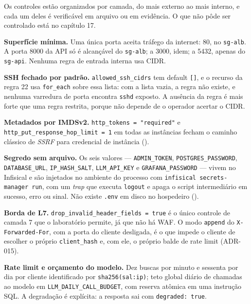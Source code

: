 \documentclass[11pt,a4paper]{article}
\begin{document}
Os controles estão organizados por camada, do mais externo ao mais interno, e cada um deles é
verificável em arquivo ou em evidência. O que não pôde ser controlado está no capítulo 17.

\textbf{Superfície mínima.} Uma única porta aceita tráfego da internet: 80, no \texttt{sg-alb}. A
porta 8000 da API só é alcançável do \texttt{sg-alb}; a 3000, idem; a 5432, apenas do
\texttt{sg-api}. Nenhuma regra de entrada interna usa CIDR.

\textbf{SSH fechado por padrão.} \texttt{allowed\_ssh\_cidrs} tem default
\texttt{[]}, e o recurso da regra 22 usa \texttt{for\_each} sobre essa lista: com a lista vazia, a
regra não existe, e nenhuma varredura de porta encontra \texttt{sshd} exposto. A ausência da regra é
mais forte que uma regra restrita, porque não depende de o operador acertar o CIDR.

\textbf{Metadados por IMDSv2.} \texttt{http\_\allowbreak{}tokens = "required"} e
\texttt{http\_\allowbreak{}put\_\allowbreak{}response\_\allowbreak{}hop\_\allowbreak{}limit = 1} em todas as instâncias fecham o caminho clássico de
\emph{SSRF} para credencial de instância ().

\textbf{Segredo sem arquivo.} Os seis valores --- \texttt{ADMIN\_TOKEN},
\texttt{POSTGRES\_PASSWORD}, \texttt{DATABASE\_URL}, \texttt{IP\_HASH\_SALT},
\texttt{LLM\_API\_KEY} e \texttt{GRAFANA\_PASSWORD} --- vivem no Infisical e são injetados no
ambiente do processo com \texttt{infisical secrets-manager run}, com um \emph{trap} que executa
\texttt{logout} e apaga o script intermediário em sucesso, erro ou sinal. Não existe \texttt{.env}
em disco no hospedeiro ().

\textbf{Borda de L7.} \texttt{drop\_\allowbreak{}invalid\_\allowbreak{}header\_\allowbreak{}fields = true} é o único controle de camada 7
que o laboratório permite, já que não há WAF. O modo \texttt{append} do
\texttt{X-Forwarded-For}, com a porta do cliente desligada, é o que impede o cliente de escolher o
próprio \texttt{client\_hash} e, com ele, o próprio balde de rate limit (ADR-015).

\textbf{Rate limit e orçamento do modelo.} Dez buscas por minuto e sessenta por dia por cliente
identificado por \texttt{sha256(sal:ip)}; teto global diário de chamadas ao modelo em
\texttt{LLM\_\allowbreak{}DAILY\_\allowbreak{}CALL\_\allowbreak{}BUDGET}, com reserva atômica em uma instrução SQL. A degradação é
explícita: a resposta sai com \texttt{degraded: true}.
\end{document}
